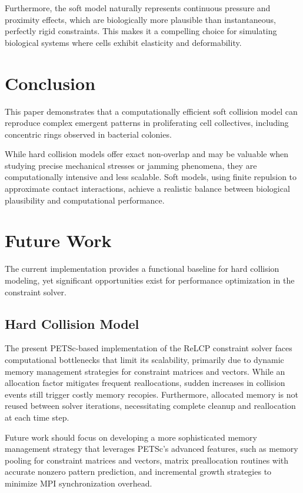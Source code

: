 \documentclass[conference]{IEEEtran}
\begin{document}
Furthermore, the soft model naturally represents continuous pressure and proximity effects, which are biologically more plausible than instantaneous, perfectly rigid constraints. This makes it a compelling choice for simulating biological systems where cells exhibit elasticity and deformability.

\section{Conclusion}

This paper demonstrates that a computationally efficient soft collision model can reproduce complex emergent patterns in proliferating cell collectives, including concentric rings observed in bacterial colonies.

While hard collision models offer exact non-overlap and may be valuable when studying precise mechanical stresses or jamming phenomena, they are computationally intensive and less scalable. Soft models, using finite repulsion to approximate contact interactions, achieve a realistic balance between biological plausibility and computational performance.

\newpage
\section{Future Work}

The current implementation provides a functional baseline for hard collision modeling, yet significant opportunities exist for performance optimization in the constraint solver.

\subsection{Hard Collision Model}
The present PETSc-based implementation of the ReLCP constraint solver faces computational bottlenecks that limit its scalability, primarily due to dynamic memory management strategies for constraint matrices and vectors. While an allocation factor mitigates frequent reallocations, sudden increases in collision events still trigger costly memory recopies. Furthermore, allocated memory is not reused between solver iterations, necessitating complete cleanup and reallocation at each time step.

Future work should focus on developing a more sophisticated memory management strategy that leverages PETSc's advanced features, such as memory pooling for constraint matrices and vectors, matrix preallocation routines with accurate nonzero pattern prediction, and incremental growth strategies to minimize MPI synchronization overhead.
\end{document}
